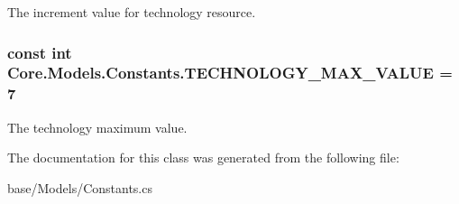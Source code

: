 The increment value for technology resource. 

\hypertarget{classCore_1_1Models_1_1Constants_a1ab07bbbce0393349cffa44d47d306cd}{}
\subsubsection[{T\+E\+C\+H\+N\+O\+L\+O\+G\+Y\+\_\+\+M\+A\+X\+\_\+\+V\+A\+L\+U\+E}]{\setlength{\rightskip}{0pt plus 5cm}const int Core.\+Models.\+Constants.\+T\+E\+C\+H\+N\+O\+L\+O\+G\+Y\+\_\+\+M\+A\+X\+\_\+\+V\+A\+L\+U\+E = 7}\label{classCore_1_1Models_1_1Constants_a1ab07bbbce0393349cffa44d47d306cd}


The technology maximum value. 



The documentation for this class was generated from the following file\+:\begin{DoxyCompactItemize}
\item 
base/\+Models/Constants.\+cs\end{DoxyCompactItemize}
